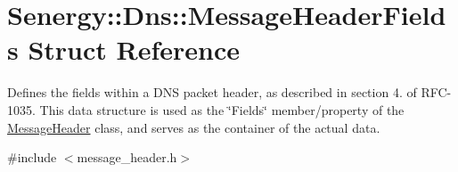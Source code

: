 \hypertarget{struct_senergy_1_1_dns_1_1_message_header_fields}{\section{Senergy\-:\-:Dns\-:\-:Message\-Header\-Fields Struct Reference}
\label{struct_senergy_1_1_dns_1_1_message_header_fields}
}


Defines the fields within a D\-N\-S packet header, as described in section 4. of R\-F\-C-\/1035. This data structure is used as the \char`\"{}\-Fields\char`\"{} member/property of the \hyperlink{class_senergy_1_1_dns_1_1_message_header}{Message\-Header} class, and serves as the container of the actual data.  




{\ttfamily \#include $<$message\-\_\-header.\-h$>$}

